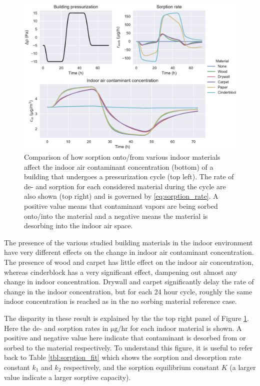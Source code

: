\begin{figure}[!htb]
  \includegraphics[width=\textwidth]{sorption_indoor_cycle.pdf}
  \caption{
  Comparison of how sorption onto/from various indoor materials affect the indoor air contaminant concentration (bottom) of a building that undergoes a pressurization cycle (top left). The rate of de- and sorption for each considered material during the cycle are also shown (top right) and is governed by \eqref{eq:sorption_rate}. A positive value means that contaminant vapors are being sorbed onto/into the material and a negative means the material is desorbing into the indoor air space.}
  \label{fig:indoor_sorption_cycle}
\end{figure}

The presence of the various studied building materials in the indoor environment have very different effects on the change in indoor air contaminant concentration.
The presence of wood and carpet has little effect on the indoor air concentration, whereas cinderblock has a very significant effect, dampening out almost any change in indoor concentration.
Drywall and carpet significantly delay the rate of change in the indoor concentration, but for each 24 hour cycle, roughly the same indoor concentration is reached as in the no sorbing material reference case.\par

The disparity in these result is explained by the the top right panel of Figure \ref{fig:indoor_sorption_cycle}.
Here the de- and sorption rates in $\mathrm{\mu g/hr}$ for each indoor material is shown.
A positive and negative value here indicate that contaminant is desorbed from or sorbed to the material respectively.
To understand this figure, it is useful to refer back to Table \ref{tbl:sorption_fit} which shows the sorption and desorption rate constant $k_1$ and $k_2$ respectively, and the sorption equilibrium constant $K$ (a larger value indicate a larger sorptive capacity).\par

